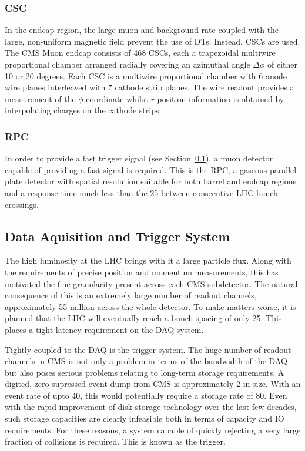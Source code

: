 \subsubsection{\acl{CSC}}
In the endcap region, the large muon and background rate coupled with the large,
non-uniform magnetic field prevent the use of \ac{DT}s. Instead, \acl{CSC}s are
used. The CMS Muon endcap consists of 468 \ac{CSC}s, each a trapezoidal
multiwire proportional chamber arranged radially covering an azimuthal angle
$\Delta\phi$ of either 10 or 20 degrees. Each \ac{CSC} is a multiwire
proportional chamber with 6 anode wire planes interleaved with 7 cathode strip
planes. The wire readout provides a measurement of the $\phi$ coordinate whilst
$r$ position information is obtained by interpolating charges on the cathode
strips.

\subsubsection{\acl{RPC}}
In order to provide a fast trigger signal (see Section~\ref{sec:trigger}), a
muon detector capable of providing a fast signal is required. This is the
\acl{RPC}, a gaseous parallel-plate detector with spatial resolution suitable
for both barrel and endcap regions and a response time much less than the
\unit{25}{\nano\second} between consecutive \ac{LHC} bunch crossings.

\subsection{Data Aquisition and Trigger System}
\label{sec:trigger}
The high luminosity at the \ac{LHC} brings with it a large particle flux. Along
with the requirements of precise position and momentum measurements, this has
motivated the fine granularity present across each \ac{CMS} subdetector. The
natural consequence of this is an extremely large number of readout channels,
approximately 55 million across the whole detector. To make matters
worse, it is planned that the \ac{LHC} will eventually reach a bunch spacing of
only \unit{25}{\nano\second}. This places a tight latency requirement on the
\ac{DAQ} system.

Tightly coupled to the \ac{DAQ} is the trigger system. The huge number of
readout channels in \ac{CMS} is not only a problem in terms of the bandwidth of
the \ac{DAQ} but also poses serious problems relating to long-term storage
requirements. A digited, zero-supressed event dump from \ac{CMS} is
approximately \unit{2}{\mega\byte} in size. With an event rate of upto
\unit{40}{\mega\hertz}, this would potentially require a storage rate of
\unit{80}{\tera\byte\per\second}. Even with the rapid improvement of disk
storage technology over the last few decades, such storage capacities are
clearly infeasible both in terms of capacity and \ac{IO} requirements. For these
reasons, a system capable of quickly rejecting a very large fraction of
collisions is required. This is known as the trigger.

